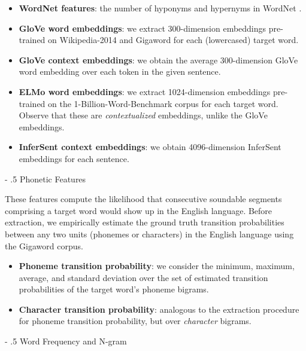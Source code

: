 \documentclass[11pt,a4paper]{article}
\makeatletter
\renewcommand\paragraph{%
    \@startsection{paragraph}{4}{0mm}%
        {-\baselineskip}%
        {.5\baselineskip}%
        {\normalfont\normalsize\bfseries}}
\makeatother
\begin{document}
\begin{itemize}
  \item \textbf{WordNet features}: the number of hyponyms and hypernyms in WordNet \citep{Fellbaum:2005}.
  \item \textbf{GloVe word embeddings}: we extract 300-dimension embeddings pre-trained on Wikipedia-2014 and Gigaword \citep{pennington2014glove} for each (lowercased) target word. 
  \item \textbf{GloVe context embeddings}: we obtain the average 300-dimension GloVe word embedding over each token in the given sentence.
  \item \textbf{ELMo word embeddings}: we extract 1024-dimension embeddings pre-trained on the 1-Billion-Word-Benchmark corpus \citep{Peters:2018} for each target word. Observe that these are \textit{contextualized} embeddings, unlike the GloVe embeddings.
  \item \textbf{InferSent context embeddings}: we obtain 4096-dimension InferSent embeddings \citep{conneau-EtAl:2017:EMNLP2017} for each sentence.
\end{itemize}

\paragraph{Phonetic Features}

These features compute the likelihood that consecutive soundable segments comprising a target word would show up in the English language. Before extraction, we empirically estimate the ground truth transition probabilities between any two units (phonemes or characters) in the English language using the Gigaword corpus. 

\begin{itemize}
  \item \textbf{Phoneme transition probability}: we consider the minimum, maximum, average, and standard deviation over the set of estimated transition probabilities of the target word's phoneme bigrams.
  \item \textbf{Character transition probability}: analogous to the extraction procedure for phoneme transition probability, but over \textit{character} bigrams.
\end{itemize}

\paragraph{Word Frequency and N-gram}
\end{document}
